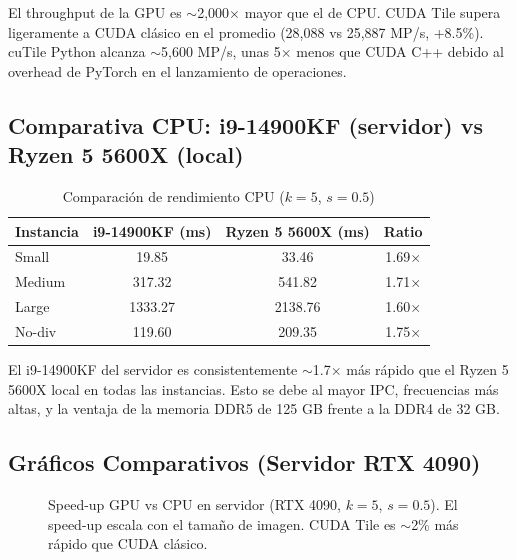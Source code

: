 \documentclass[12pt,a4paper]{article}
\begin{document}
El throughput de la GPU es $\sim$2,000$\times$ mayor que el de CPU. CUDA Tile supera ligeramente a CUDA cl\'asico en el promedio (28,088 vs 25,887 MP/s, +8.5\%). cuTile Python alcanza $\sim$5,600 MP/s, unas 5$\times$ menos que CUDA C++ debido al overhead de PyTorch en el lanzamiento de operaciones.

\subsection{Comparativa CPU: i9-14900KF (servidor) vs Ryzen 5 5600X (local)}

\begin{table}[H]
\centering
\caption{Comparaci\'on de rendimiento CPU ($k=5$, $s=0.5$)}
\begin{tabular}{lccc}
\toprule
\textbf{Instancia} & \textbf{i9-14900KF (ms)} & \textbf{Ryzen 5 5600X (ms)} & \textbf{Ratio} \\
\midrule
Small    & 19.85  & 33.46  & 1.69$\times$ \\
Medium   & 317.32 & 541.82 & 1.71$\times$ \\
Large    & 1333.27& 2138.76& 1.60$\times$ \\
No-div   & 119.60 & 209.35 & 1.75$\times$ \\
\bottomrule
\end{tabular}
\end{table}

El i9-14900KF del servidor es consistentemente $\sim$1.7$\times$ m\'as r\'apido que el Ryzen 5 5600X local en todas las instancias. Esto se debe al mayor IPC, frecuencias m\'as altas, y la ventaja de la memoria DDR5 de 125 GB frente a la DDR4 de 32 GB.

\subsection{Gr\'aficos Comparativos (Servidor RTX 4090)}

\begin{figure}[H]
\centering
{}
\caption{Speed-up GPU vs CPU en servidor (RTX 4090, $k=5$, $s=0.5$). El speed-up escala con el tama\~no de imagen. CUDA Tile es $\sim$2\% m\'as r\'apido que CUDA cl\'asico.}
\label{fig:speedup}
\end{figure}
\end{document}
